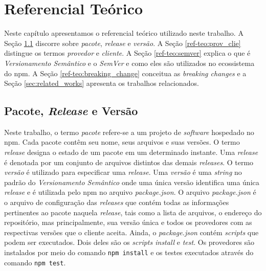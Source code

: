 \chapter{Referencial Teórico}
\label{cap:ref-teorico}

Neste capítulo apresentamos o referencial teórico utilizado neste trabalho. A Seção \ref{ref-teo:pac_rel_ver} discorre sobre \textit{pacote}, \textit{release} e \textit{versão}. A Seção \ref{ref-teo:prov_clie} distingue os termos \textit{provedor} e \textit{cliente}. A Seção \ref{ref-teo:semver} explica o que é \textit{Versionamento Semântico} e o \textit{SemVer} e como eles são utilizados no ecossistema do \textsf{npm}. A Seção \ref{ref-teo:breaking_change} conceitua as \textit{breaking changes} e a Seção \ref{sec:related_works} apresenta os trabalhos relacionados.

\section{Pacote, \textit{Release} e Versão}
\label{ref-teo:pac_rel_ver}
Neste trabalho, o termo \textit{pacote} refere-se a um projeto de \textit{software} hospedado no \textsf{npm}. Cada pacote contêm seu nome, seus arquivos e suas versões. O termo \textit{release} designa o estado de um pacote em um determinado instante. Uma \textit{release} é denotada por um conjunto de arquivos distintos das demais \textit{releases}. O termo \textit{versão} é utilizado para especificar uma \textit{release}. Uma \textit{versão} é uma \textit{string} no padrão do \textit{Versionamento Semântico} onde uma única versão identifica uma única \textit{release} e é utilizada pelo \textsf{npm} no arquivo \textit{package.json}. O arquivo \textit{package.json} é o arquivo de configuração das \textit{releases} que contém todas as informações pertinentes ao pacote naquela \textit{release}, tais como a lista de arquivos, o endereço do repositório, mas principalmente, sua versão única e todos os provedores com as respectivas versões que o cliente aceita. Ainda, o \textit{package.json} contém \textit{scripts} que podem ser executados. Dois deles são os \textit{scripts install} e \textit{test}. Os provedores são instalados por meio do comando \texttt{npm install} e os testes executados através do comando \texttt{npm test}.

